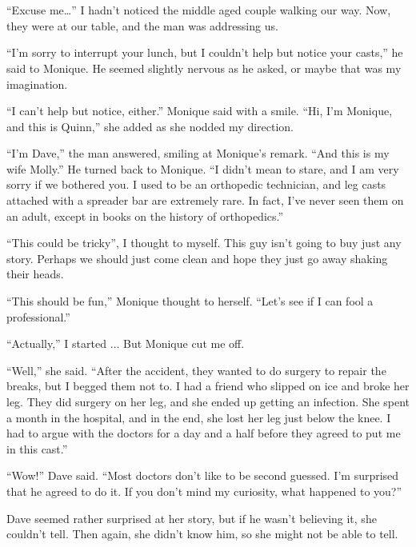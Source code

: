\chapter{~}
``Excuse me…'' I hadn't noticed the middle aged couple walking our way. Now, they were at our
table, and the man was addressing us.

``I'm sorry to interrupt your lunch, but I couldn't help but notice your casts,'' he said to
Monique. He seemed slightly nervous as he asked, or maybe that was my imagination.

``I can't help but notice, either.'' Monique said with a smile. ``Hi, I'm Monique, and this is
Quinn,'' she added as she nodded my direction.

``I'm Dave,'' the man answered, smiling at Monique's remark. ``And this is my wife Molly.'' He
turned back to Monique. ``I didn't mean to stare, and I am very sorry if we bothered you. I used
to be an orthopedic technician, and leg casts attached with a spreader bar are extremely rare.
In fact, I've never seen them on an adult, except in books on the history of orthopedics.''

``This could be tricky'', I thought to myself. This guy isn't going to buy just any story.
Perhaps we should just come clean and hope they just go away shaking their heads.

\begin{thought}
``This should be fun,'' Monique thought to herself. ``Let's see if I can fool a professional.''
\end{thought}

``Actually,'' I started $\ldots$ But Monique cut me off.

``Well,'' she said. ``After the accident, they wanted to do surgery to repair the breaks, but
I begged them not to. I had a friend who slipped on ice and broke her leg. They did surgery on
her leg, and she ended up getting an infection. She spent a month in the hospital, and in the
end, she lost her leg just below the knee. I had to argue with the doctors for a day and a half
before they agreed to put me in this cast.''

``Wow!'' Dave said. ``Most doctors don't like to be second guessed. I'm surprised that he
agreed to do it. If you don't mind my curiosity, what happened to you?''

\begin{thought}
Dave seemed rather surprised at her story, but if he wasn't believing it, she couldn't
tell. Then again, she didn't know him, so she might not be able to tell.
\end{thought}

